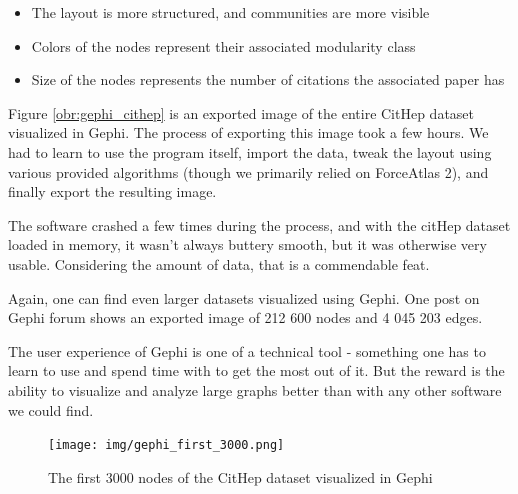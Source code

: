 \begin{itemize}
  \item The layout is more structured, and communities are more visible
  \item Colors of the nodes represent their associated modularity class
  \item Size of the nodes represents the number of citations the associated paper has
\end{itemize}

Figure \ref{obr:gephi_cithep} is an exported image of the entire CitHep dataset visualized in Gephi.
The process of exporting this image took a few hours.
We had to learn to use the program itself, import the data,
tweak the layout using various provided algorithms (though we primarily relied on ForceAtlas 2), and finally export the resulting image.

The software crashed a few times during the process, and with the citHep dataset loaded in memory, it wasn't always buttery smooth, but it was otherwise very usable.
Considering the amount of data, that is a commendable feat.

Again, one can find even larger datasets visualized using Gephi.
One post on Gephi forum \cite{gephi_big_graph_forum} shows an exported image of 212 600 nodes and 4 045 203 edges.

The user experience of Gephi is one of a technical tool - something one has to learn to use and spend time with to get the most out of it.
But the reward is the ability to visualize and analyze large graphs better than with any other software we could find.

\begin{figure}[p]\centering
  \texttt{[image: img/gephi\_first\_3000.png]}
  \caption{The first 3000 nodes of the CitHep dataset visualized in Gephi}
  \label{obr:gephi_cithep_3k}
\end{figure}


